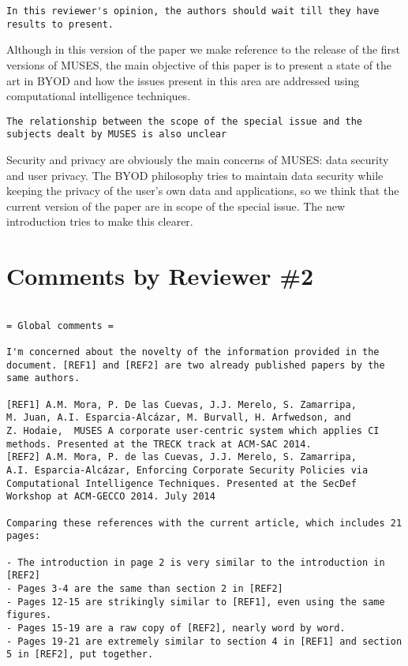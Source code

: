 \documentclass[preprint]{elsarticle}
\begin{document}
{\begin{verbatim}
In this reviewer's opinion, the authors should wait till they have
results to present. 
\end{verbatim}

Although in this version of the paper we make reference to the release
of the first versions of MUSES, the main objective  of this paper is
to present a state of the art in BYOD and how the issues present in
this area are addressed using computational intelligence techniques.

\begin{verbatim}
The relationship between the scope of the special issue and the
subjects dealt by MUSES is also unclear
\end{verbatim}

Security and privacy are obviously the main concerns of MUSES: data
security and user privacy. The BYOD philosophy tries to maintain data
security while keeping the privacy of the user's own data and
applications, so we think that the current version of the paper are in
scope of the special issue. The new introduction tries to make this
clearer. 


\section{Comments by Reviewer \#2}

\begin{verbatim}

= Global comments =

I'm concerned about the novelty of the information provided in the
document. [REF1] and [REF2] are two already published papers by the
same authors. 

[REF1] A.M. Mora, P. De las Cuevas, J.J. Merelo, S. Zamarripa,
M. Juan, A.I. Esparcia-Alcázar, M. Burvall, H. Arfwedson, and
Z. Hodaie,  MUSES A corporate user-centric system which applies CI
methods. Presented at the TRECK track at ACM-SAC 2014. 
[REF2] A.M. Mora, P. de las Cuevas, J.J. Merelo, S. Zamarripa,
A.I. Esparcia-Alcázar, Enforcing Corporate Security Policies via
Computational Intelligence Techniques. Presented at the SecDef
Workshop at ACM-GECCO 2014. July 2014 

Comparing these references with the current article, which includes 21 pages:

- The introduction in page 2 is very similar to the introduction in [REF2]
- Pages 3-4 are the same than section 2 in [REF2]
- Pages 12-15 are strikingly similar to [REF1], even using the same figures.
- Pages 15-19 are a raw copy of [REF2], nearly word by word.
- Pages 19-21 are extremely similar to section 4 in [REF1] and section
5 in [REF2], put together. 


\end{verbatim}}
\end{document}
